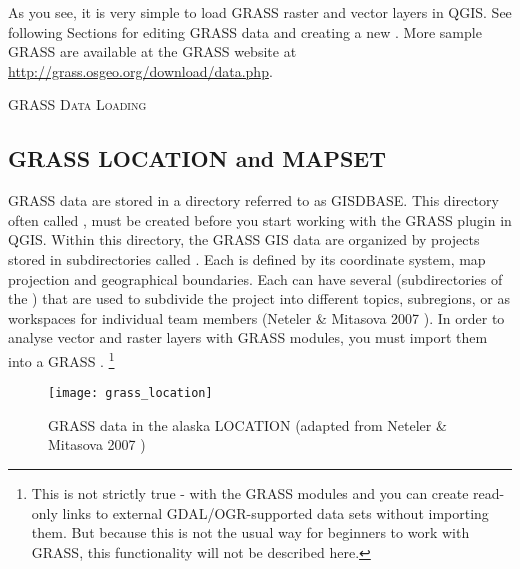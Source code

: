 As you see, it is very simple to load GRASS raster and vector layers in QGIS. 
See following Sections for editing GRASS data and creating a new 
. More sample GRASS  are available at 
the GRASS website at \url{http://grass.osgeo.org/download/data.php}.

\begin{Tip}\caption{\textsc{GRASS Data Loading}}
\end{Tip} 

\subsection{GRASS LOCATION and MAPSET}\label{sec:create_loc}

GRASS data are stored in a directory referred to as GISDBASE. This directory 
often called , must be created before you start working 
with the GRASS plugin in QGIS. Within this directory, the GRASS GIS data 
are organized by projects stored in subdirectories called . 
Each  is defined by its coordinate system, map projection 
and geographical boundaries. Each  can have several 
 (subdirectories of the ) that are used 
to subdivide the project into different topics, subregions, or as workspaces 
for individual team members (Neteler \& Mitasova 2007 
\cite{neteler_mitasova07}). In order to analyse vector and raster layers with 
GRASS modules, you must import them into a GRASS .
\footnote{This is not strictly true - with the GRASS modules 
 and  you can create read-only links 
to external GDAL/OGR-supported data sets without importing them. But because 
this is not the usual way for beginners to work with GRASS, this functionality 
will not be described here.}

\begin{figure}[ht]
\begin{center}
\caption{GRASS data in the alaska LOCATION (adapted from Neteler \& 
Mitasova 2007 \cite{neteler_mitasova07})}\label{fig:grass_location}\smallskip
\texttt{[image: grass\_location]}
\end{center}  
\end{figure}

